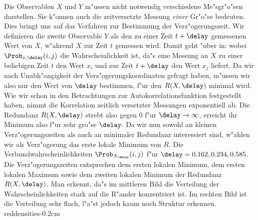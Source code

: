 Die Observablen $X$ und $Y$ m"ussen nicht notwendig verschiedene Me"sgr"o"sen darstellen.
Sie k"onnen auch die zeitversetzte Messung \emph{einer} Gr"o"se bedeuten.  Dies bringt uns
auf das Verfahren zur Bestimmung der Verz"ogerungszeit.  Wir definieren die zweite
Observable $Y$ als den zu einer Zeit $t+\delay$ gemessenen Wert von $X$, w"ahrend $X$ zur
Zeit $t$ gemessen wird. Damit geht  "uber in:
wobei $\Prob_{x,\delay}(i,j)$ die Wahrscheinlichkeit ist, da"s
eine Messung an $X$ zu einer beliebigen Zeit $t$ den Wert $x_i$ und zur Zeit $t+\delay$
den Wert $x_j$ liefert.  Da wir nach
Unabh"angigkeit der Verz"ogerungskoordinaten gefragt haben, m"ussen wir also nur den Wert
von $\delay$ bestimmen, f"ur den $R(X,\delay)$ minimal wird. Wie wir schon in den
Betrachtungen zur Autokorrelationsfunktion festgestellt haben, nimmt die Korrelation
zeitlich versetzter Messungen exponentiell ab. Die Redundanz $R(X,\delay)$ strebt also
gegen 0 f"ur $\delay\to\infty$, erreicht ihr Minimum also f"ur sehr gro"se $\delay$. Da
wir nun sowohl an kleinen Verz"ogerungszeiten als auch an minimaler Redundanz interessiert
sind, w"ahlen wir als Verz"ogerung das erste lokale Minimum von $R$.
 {Die
  Verbundwahrscheinlichkeiten $\Prob_{X_\delay}(i,j)$ f"ur $\delay=0.162,0.234,0.585$. Die
  Verz"ogerungszeiten entsprechen dem ersten lokalen Minimum, dem ersten lokalen Maximum
  sowie dem zweiten lokalen Minimum der Redundanz $R(X,\delay)$. Man erkennt, da"s im
  mittleren Bild die Verteilung der Wahrscheinlichkeiten stark auf die R"ander
  konzentriert ist. Im rechten Bild ist die Verteilung sehr flach, l"a"st jedoch kaum noch
  Struktur erkennen.  }{reddensities}{-0.2cm}


